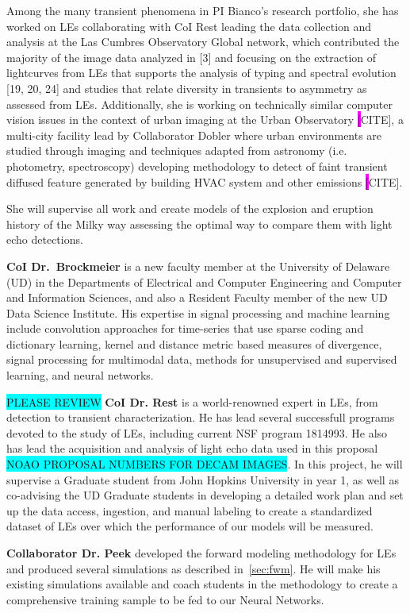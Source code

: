 \documentclass{proposalnsf}
\newcommand{\armin}[1]{\colorbox{cyan}{#1}}
\newcommand{\changeit}[1]{\colorbox{magenta}{#1}}
\begin{document}
Among the many transient phenomena in PI Bianco’s research portfolio, she has worked on LEs collaborating with CoI Rest leading the data collection and analysis at the Las Cumbres Observatory Global network, which contributed the majority of the image data analyzed in [3] and focusing on the extraction of lightcurves from LEs that supports the analysis of typing and spectral evolution [19, 20, 24]
and studies that relate diversity in transients to asymmetry as assessed from LEs.  Additionally, she is working on technically similar computer vision issues in the context of urban imaging at the Urban Observatory \changeit[CITE], a multi-city facility lead by Collaborator Dobler where urban environments are studied through imaging and techniques adapted from astronomy (i.e.  photometry, spectroscopy) developing methodology to detect of faint transient diffused feature generated by building HVAC system and other emissions \changeit[CITE].

She will supervise all work and create models of the explosion and eruption history of the Milky way assessing the optimal way to compare them with light echo detections.

{\bf CoI Dr.\ Brockmeier} is a new faculty member at the University of Delaware (UD) in the Departments of Electrical and Computer Engineering and Computer and Information Sciences, and also a Resident Faculty member of the new UD Data Science Institute.  His expertise in signal processing and machine learning include convolution approaches for time-series that use sparse coding and dictionary learning, kernel and distance metric based measures of divergence, signal processing for multimodal data, methods for unsupervised and supervised learning, and neural networks. 

\armin{PLEASE REVIEW}
{\bf CoI Dr. Rest} is a world-renowned expert in LEs, from detection to transient characterization.  He has lead several successfull programs devoted to the study of LEs, including current NSF program 1814993.  He also has lead the acquisition and analysis of light echo data used in this proposal \armin{NOAO PROPOSAL NUMBERS FOR DECAM IMAGES}.  In this project, he will supervise a Graduate student from John Hopkins University in year 1, as well as co-advising the UD Graduate students in developing a detailed work plan and set up the data access, ingestion, and manual labeling to create a standardized dataset of LEs over which the performance of our models will be measured.   


{\bf Collaborator Dr. Peek} developed the forward modeling methodology for LEs and produced several simulations as described in~\autoref{sec:fwm}.  He will make his existing simulations available and coach students in the methodology to create a comprehensive training sample to be fed to our Neural Networks.  
\end{document}
